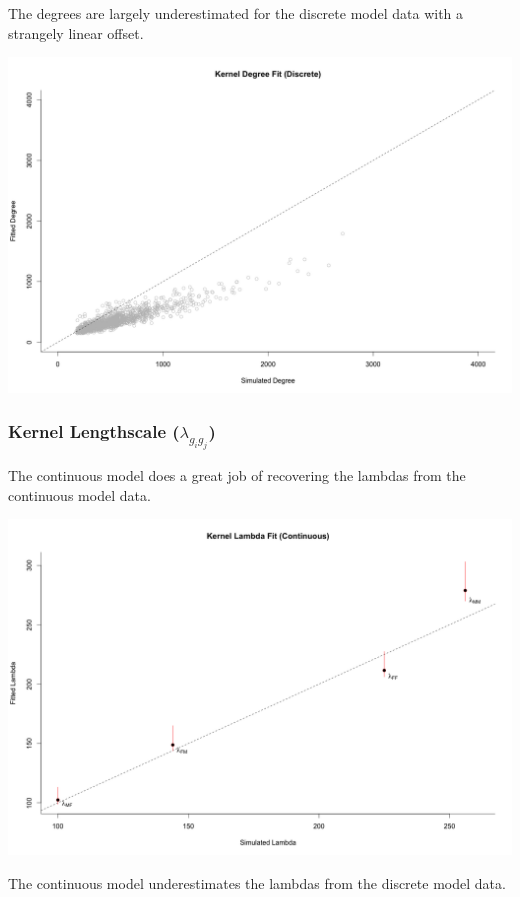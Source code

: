 \documentclass[12pt]{article}
\begin{document}
\noindent The degrees are largely underestimated for the discrete model data with a strangely linear offset.

\includegraphics[scale = 0.36]{Estimates_Degree_Discrete.png}

\pagebreak
\subsubsection*{Kernel Lengthscale ($\lambda_{g_ig_j}$)}
The continuous model does a great job of recovering the lambdas from the continuous model data.

\includegraphics[scale = 0.37]{Estimates_Lambda_Continuous.png}

\noindent The continuous model underestimates the lambdas from the discrete model data.
\end{document}

